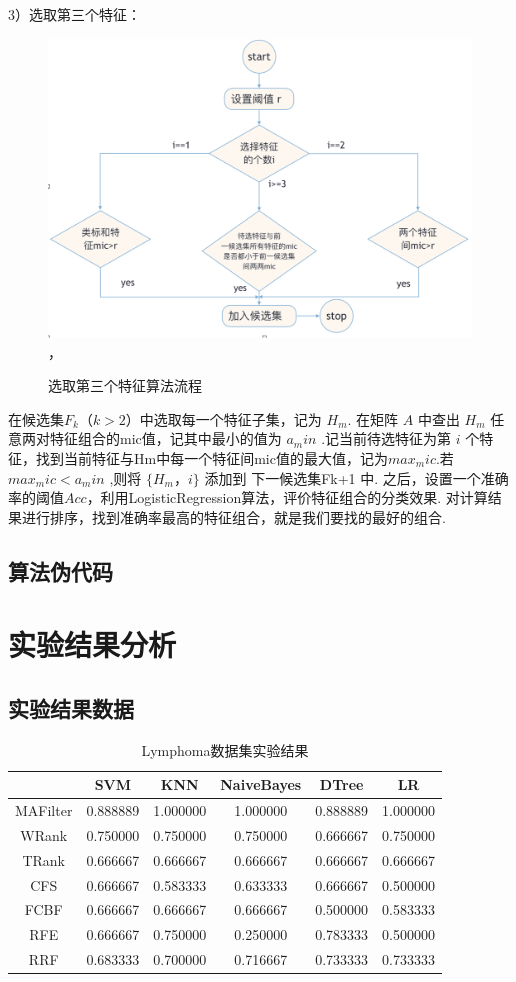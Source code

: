 \documentclass{njubachelor}
\begin{document}
3）选取第三个特征：
\begin{figure}[!ht]
    \centering
    \includegraphics[width=5.5in]{pic/fig6}， 
    \caption{选取第三个特征算法流程}
\end{figure}

在候选集$F_k（k>2）$中选取每一个特征子集，记为 $H_m$. 在矩阵 $A$ 中查出 $H_m$ 任意两对特征组合的mic值，记其中最小的值为 $a_min$ .记当前待选特征为第 $i$ 个特征，找到当前特征与Hm中每一个特征间mic值的最大值，记为$max_mic$.若$max_mic < a_min$ ,则将 $\{H_m ，i\}$ 添加到 下一候选集Fk+1 中.
之后，设置一个准确率的阈值$Acc$，利用LogisticRegression算法，评价特征组合的分类效果. 对计算结果进行排序，找到准确率最高的特征组合，就是我们要找的最好的组合.

\subsection{算法伪代码}

\newpage
\section{实验结果分析}
\subsection{实验结果数据}

\begin{table}        
\centering
\caption{Lymphoma数据集实验结果}
\begin{tabular}{cccccc}
\hline
  & SVM & KNN & NaiveBayes & DTree & LR\\
\hline
MAFilter&	0.888889&	1.000000	&1.000000	&0.888889&	1.000000\\
WRank	&0.750000&	0.750000	&0.750000	&0.666667	&0.750000\\
TRank&	0.666667	&0.666667&	0.666667	&0.666667&	0.666667\\
CFS&	0.666667	&0.583333	&0.633333&	0.666667&	0.500000\\
FCBF&	0.666667&	0.666667	&0.666667	&0.500000	&0.583333\\
RFE	&0.666667	&0.750000&	0.250000&	0.783333&	0.500000\\
RRF	&0.683333&	0.700000&	0.716667&	0.733333&	0.733333\\
\hline
\end{tabular}
\end{table}
\end{document}
